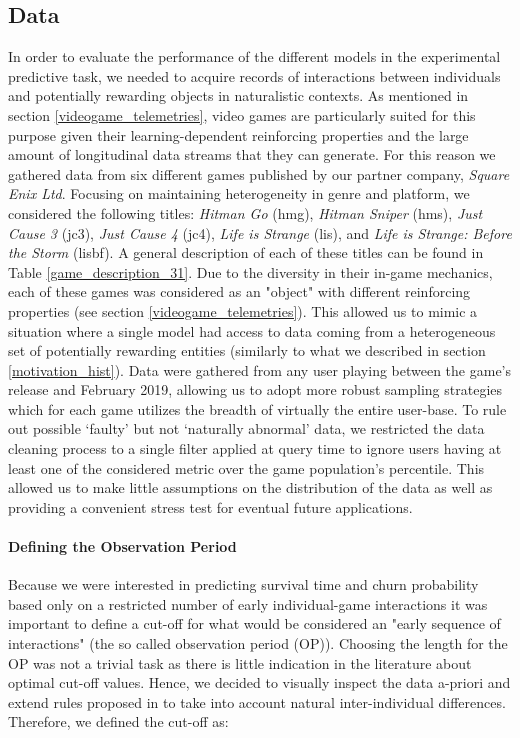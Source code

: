 \subsection{Data}
\label{data_1}
In order to evaluate the performance of the different models in the experimental predictive task, we needed to acquire records of interactions between individuals and potentially rewarding objects in naturalistic contexts. As mentioned in section \ref{videogame_telemetries}, video games are particularly suited for this purpose given their learning-dependent reinforcing properties and the large amount of longitudinal data streams that they can generate. For this reason we gathered data from six different games published by our partner company, \textit{Square Enix Ltd}. Focusing on maintaining heterogeneity in genre and platform, we considered the following titles: \emph{Hitman Go} (hmg), \emph{Hitman Sniper} (hms), \emph{Just Cause 3} (jc3), \emph{Just Cause 4} (jc4), \emph{Life is Strange} (lis), and \emph{Life is Strange: Before the Storm} (lisbf). A general description of each of these titles can be found in Table \ref{game_description_31}. Due to the diversity in their in-game mechanics, each of these games was considered as an "object" with different reinforcing properties (see section \ref{videogame_telemetries}). This allowed us to mimic a situation where a single model had access to data coming from a heterogeneous set of potentially rewarding entities (similarly to what we described in section \ref{motivation_hist}). Data were gathered from any user playing between the game's release and February 2019, allowing us to adopt more robust sampling strategies which for each game utilizes the breadth of virtually the entire user-base. To rule out possible `faulty' but not `naturally abnormal' data, we restricted the data cleaning process to a single filter applied at query time to ignore users having at least one of the considered metric over the game population's  percentile. This allowed us to make little assumptions on the distribution of the data as well as providing a convenient stress test for eventual future applications.



\paragraph*{Defining the Observation Period}
Because we were interested in predicting survival time and churn probability based only on a restricted number of early individual-game interactions it was important to define a cut-off for what would be considered an "early sequence of interactions" (the so called observation period (OP)). Choosing the length for the OP was not a trivial task as there is little indication in the literature about optimal cut-off values. Hence, we decided to visually inspect the data a-priori and extend rules proposed in \cite{drachen2016rapid, milovsevic2017early} to take into account natural inter-individual differences. Therefore, we defined the cut-off as:

